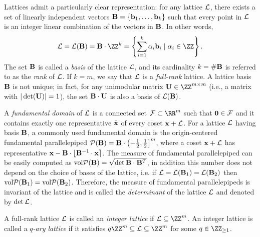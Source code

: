 \documentclass{fundam}
\begin{document}
Lattices admit a particularly clear representation: for any lattice $\mathcal{L}$, there exists a set of linearly independent vectors $\mathbf{B} = \{\mathbf{b}_1, \ldots, \mathbf{b}_k\}$ such that every point in $\mathcal{L}$ is an integer linear combination of the vectors in $\mathbf{B}$. In other words,
\begin{align*}
	\Lat = \Lat(\vr{B}) = \vr{B} \cdot \ZZ^k = \left\{ \sum_{i=1}^{k} \alpha_i \vr{b}_i \mid \alpha_i \in \ZZ \right\}.
\end{align*}
The set $\mathbf{B}$ is called a \textit{basis} of the lattice $\mathcal{L}$, and its cardinality $k = \#\mathbf{B}$ is referred to as the \textit{rank} of $\mathcal{L}$.  
If $k = m$, we say that $\mathcal{L}$ is a \textit{full-rank} lattice.  
A lattice basis $\mathbf{B}$ is not unique; in fact, for any unimodular matrix $\vr{U} \in \ZZ^{m \times m}$ (i.e., a matrix with $|\det(\mathbf{U})| = 1$), the set $\mathbf{B} \cdot \mathbf{U}$ is also a basis of $\mathcal{L}(\mathbf{B})$.


A \emph{fundamental domain} of $\mathcal{L}$ is a connected set $\Fun\subset \RR^{m}$ such that $\mathbf{0}\in\mathcal{F}$ and it contains exactly one representative $\bar{\mathbf{x}}$ of every coset $\mathbf{x}+\mathcal{L}$. For a lattice $\mathcal{L}$ having basis $\mathbf{B}$, a commonly used fundamental domain is the origin-centered fundamental parallelepiped $\mathcal{P}(\mathbf{B}) = \mathbf{B}\cdot \left( -\frac{1}{2}, \frac{1}{2}  \right]^{m}$, where a coset $\mathbf{x}+\mathcal{L}$ has representative $\mathbf{x} - \mathbf{B}\cdot \lfloor \mathbf{B}^{-1}\cdot \mathbf{x}\rceil$. The measure of fundamental parallelepiped  can be easily computed as $\text{vol} \mathcal{P}(\mathbf{B}) = \sqrt{\det\mathbf{B}\cdot \mathbf{B}^{T}}$, in addition this number does not depend on the choice of bases of the lattice, i.e. if $\mathcal{L} = \mathcal{L}(\mathbf{B}_{1}) = \mathcal{L}(\mathbf{B}_{2})$ then $\text{vol} \mathcal{P}(\mathbf{B}_{1}) = \text{vol} \mathcal{P}(\mathbf{B}_{2})$. Therefore, the measure of fundamental parallelepipeds is invariant of the lattice and is called the \textit{determinant} of the lattice $\mathcal{L}$ and denoted by $\det\mathcal{L}$.

A full-rank lattice $\mathcal{L}$ is called an \textit{integer lattice} if $\Lat \subseteq \ZZ^m$. An integer lattice is called a \textit{$q$-ary lattice} if it satisfies $q\ZZ^m \subseteq \Lat \subseteq \ZZ^m$ for some $q \in \ZZ_{\geq 1}$.
\end{document}
